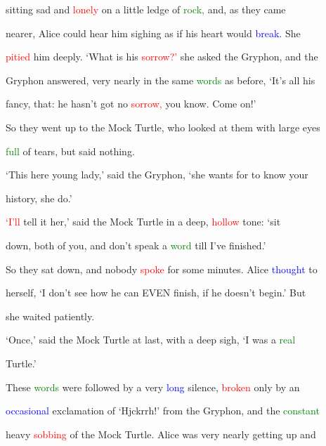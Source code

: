  sitting sad and \textcolor{red}{lonely} on a little ledge of \textcolor{green}{rock,} and, as they came

 nearer, Alice could hear him sighing as if his heart would \textcolor{blue}{break.} She

 \textcolor{red}{pitied} him deeply. ‘What is his \textcolor{red}{sorrow?’} she asked the Gryphon, and the

 Gryphon answered, very nearly in the same \textcolor{green}{words} as before, ‘It’s all his

 \textcolor{BurntOrange}{fancy,} that: he hasn’t got no \textcolor{red}{sorrow,} you know. Come on!’



 So they went up to the Mock Turtle, who looked at them with large eyes

 \textcolor{green}{full} of tears, but said nothing.



 ‘This here \textcolor{BurntOrange}{young} lady,’ said the Gryphon, ‘she wants for to know your

 history, she do.’



 \textcolor{red}{‘I’ll} tell it her,’ said the Mock Turtle in a deep, \textcolor{red}{hollow} tone: ‘sit

 down, both of you, and don’t speak a \textcolor{green}{word} till I’ve finished.’



 So they sat down, and nobody \textcolor{red}{spoke} for some minutes. Alice \textcolor{blue}{thought} to

 herself, ‘I don’t see how he can EVEN finish, if he doesn’t begin.’ But

 she \textcolor{BurntOrange}{waited} patiently.



 ‘Once,’ said the Mock Turtle at last, with a deep sigh, ‘I was a \textcolor{green}{real}

 Turtle.’



 These \textcolor{green}{words} were followed by a very \textcolor{blue}{long} silence, \textcolor{red}{broken} only by an

 \textcolor{blue}{occasional} exclamation of ‘Hjckrrh!’ from the Gryphon, and the \textcolor{green}{constant}

 heavy \textcolor{red}{sobbing} of the Mock Turtle. Alice was very nearly getting up and

